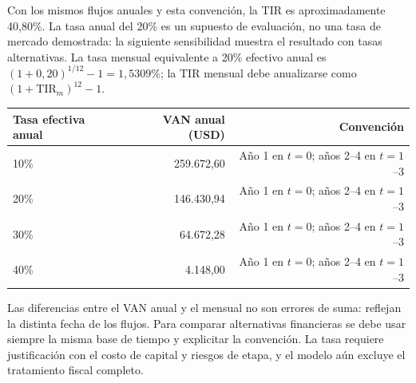 Con los mismos flujos anuales y esta convención, la TIR es aproximadamente 40,80\%. La tasa anual del 20\% es un supuesto de evaluación, no una tasa de mercado demostrada: la siguiente sensibilidad muestra el resultado con tasas alternativas. La tasa mensual equivalente a 20\% efectivo anual es $(1+0{,}20)^{1/12}-1=1{,}5309\%$; la TIR mensual debe anualizarse como $(1+\mathrm{TIR}_{m})^{12}-1$.
\begin{center}\small
\begin{tabular}{lrr}\toprule
Tasa efectiva anual & VAN anual (USD) & Convención\\\midrule
10\% & 259.672,60 & Año 1 en $t=0$; años 2--4 en $t=1$--3\\
20\% & 146.430,94 & Año 1 en $t=0$; años 2--4 en $t=1$--3\\
30\% & 64.672,28 & Año 1 en $t=0$; años 2--4 en $t=1$--3\\
40\% & 4.148,00 & Año 1 en $t=0$; años 2--4 en $t=1$--3\\
\bottomrule\end{tabular}\end{center}
Las diferencias entre el VAN anual y el mensual no son errores de suma: reflejan la distinta fecha de los flujos. Para comparar alternativas financieras se debe usar siempre la misma base de tiempo y explicitar la convención. La tasa requiere justificación con el costo de capital y riesgos de etapa, y el modelo aún excluye el tratamiento fiscal completo.

